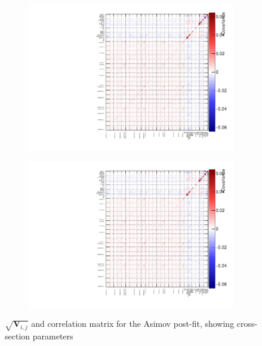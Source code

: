 \begin{figure}[h]
	\begin{subfigure}[t]{0.49\textwidth}
		\includegraphics[width=\textwidth, trim={0mm 0mm 0mm 0mm}, clip,page=11]{figures/mach3/Asimov/2017b_NewDet_NewData_Asimov_Long_0_drawCorr.pdf}
	\end{subfigure}
	\begin{subfigure}[t]{0.49\textwidth}
		\includegraphics[width=\textwidth, trim={0mm 0mm 0mm 0mm}, clip,page=12]{figures/mach3/Asimov/2017b_NewDet_NewData_Asimov_Long_0_drawCorr.pdf}
	\end{subfigure}
	\caption{$\sqrt{\mathbf{V}_{i,j}}$ and correlation matrix for the Asimov post-fit, showing cross-section parameters}
	\label{fig:asimov_xsec_corr}
\end{figure}
